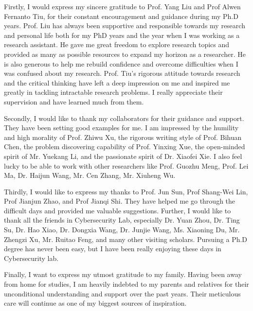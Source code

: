 Firstly, I would express my sincere gratitude to Prof. Yang Liu and Prof Alwen Fernanto Tiu, for their constant encouragement and guidance during my Ph.D years. Prof. Liu has always been supportive and responsible towards my research and personal life both for my PhD years and the year when I was working as a research assistant. He gave me great freedom to explore research topics and provided as many as possible resources to expand my horizon as a researcher. He is also generous to help me rebuild confidence and overcome difficulties when I was confused about my research. Prof. Tiu's rigorous attitude towards research and the critical thinking have left a deep impression on me and inspired me greatly in tackling intractable research problems. I really appreciate their supervision and have learned much from them.

Secondly, I would like to thank my collaborators for their guidance and support. They have been setting good examples for me. I am impressed by the humility and high morality of Prof. Zhiwu Xu, the rigorous writing style of Prof. Bihuan Chen, the problem discovering capability of Prof. Yinxing Xue, the open-minded spirit of Mr. Yuekang Li, and the passionate spirit of Dr. Xiaofei Xie. I also feel lucky to be able to work with other researchers like Prof. Guozhu Meng, Prof. Lei Ma, Dr. Haijun Wang, Mr. Cen Zhang, Mr. Xiuheng Wu.

Thirdly, I would like to express my thanks to Prof. Jun Sun, Prof Shang-Wei Lin, Prof Jianjun Zhao, and Prof Jianqi Shi. They have helped me go through the difficult days and provided me valuable suggestions. Further, I would like to thank all the friends in Cybersecurity Lab, especially Dr. Yuan Zhou, Dr. Ting Su, Dr. Hao Xiao, Dr. Dongxia Wang, Dr. Junjie Wang, Ms. Xiaoning Du, Mr. Zhengzi Xu, Mr. Ruitao Feng, and many other visiting scholars. Pursuing a Ph.D degree has never been easy, but I have been really enjoying these days in Cybersecurity lab.

Finally, I want to express my utmost gratitude to my family. Having been away from home for studies, I am heavily indebted to my parents and relatives for their unconditional understanding and support over the past years. Their meticulous care will continue as one of my biggest sources of inspiration.